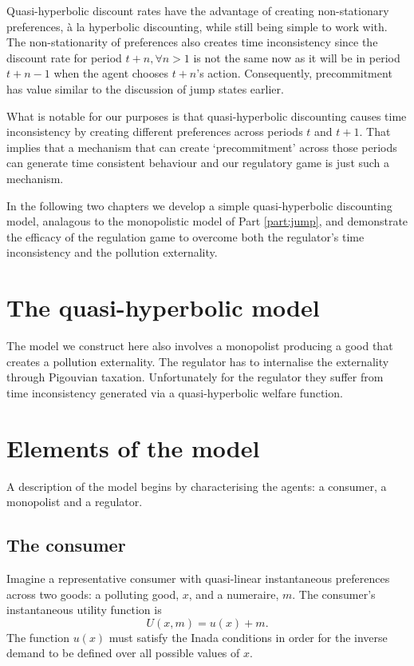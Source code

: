 Quasi-hyperbolic discount rates have the advantage of creating
non-stationary preferences, \`{a} la hyperbolic discounting, while
still being simple to work with. The non-stationarity of preferences
also creates time inconsistency since the discount rate for period
$t+n, \forall n>1$ is not the same now as it will be in period $t+n-1$
when the agent chooses $t+n$'s action. Consequently, precommitment
has value similar to the discussion of jump states earlier.

What is notable for our purposes is that quasi-hyperbolic discounting
causes time inconsistency by creating different preferences across
periods $t$ and $t+1$. That implies that a mechanism that can create
`precommitment' across those periods can generate time consistent
behaviour and our regulatory game is just such a mechanism.

In the following two chapters we develop a simple quasi-hyperbolic
discounting model, analagous to the monopolistic model of Part
\ref{part:jump}, and demonstrate the efficacy of the regulation game
to overcome both the regulator's time inconsistency and the pollution
externality.

\section{The quasi-hyperbolic model}
\label{sec:quasi-hyperb-model}

The model we construct here also involves a monopolist producing a
good that creates a pollution externality. The regulator has to
internalise the externality through Pigouvian taxation. Unfortunately
for the regulator they suffer from time inconsistency generated via a
quasi-hyperbolic welfare function.

\section{Elements of the model}
\label{sec:elements-model}


A description of the model begins by characterising the agents: a
consumer, a monopolist and a regulator.

\subsection{The consumer}
\label{sec:consumer}

Imagine a representative consumer with quasi-linear instantaneous
preferences across two goods: a polluting good, $x$, and a numeraire,
$m$. The consumer's instantaneous utility function is
\begin{equation}
  \label{eq:27}
  U(x,m) = u(x) + m.
\end{equation}
The function $u(x)$ must satisfy the Inada conditions in order for the
inverse demand to be defined over all possible values of
$x$.

